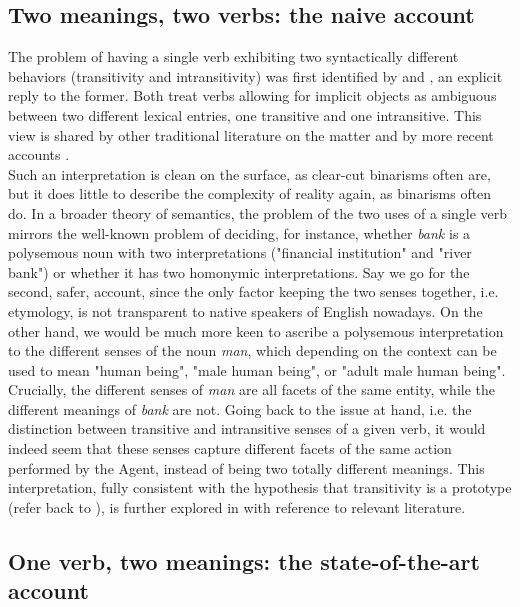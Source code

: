 \subsection{Two meanings, two verbs: the naive account} 

The problem of having a single verb exhibiting two syntactically different behaviors (transitivity and intransitivity) was first identified by \textcite{fodor1980functional} and \textcite{dowty1981quantification}, an explicit reply to the former. Both treat verbs allowing for implicit objects as ambiguous between two different lexical entries, one transitive and one intransitive. This view is shared by other traditional literature on the matter \parencite{Cote1996, Mittwoch1982, vanvalinlapolla1997syntax, brisson1994licensing, FellbaumKegl1989taxonomic} and by more recent accounts \parencite{PethoKardos2006, BourmayanRecanati2013}.\\
Such an interpretation is clean on the surface, as clear-cut binarisms often are, but it does little to describe the complexity of reality \textemdash again, as binarisms often do. In a broader theory of semantics, the problem of the two uses of a single verb mirrors the well-known problem of deciding, for instance, whether \textit{bank} is a polysemous noun with two interpretations ("financial institution" and "river bank") or whether it has two homonymic interpretations. Say we go for the second, safer, account, since the only factor keeping the two senses together, i.e. etymology, is not transparent to native speakers of English nowadays. On the other hand, we would be much more keen to ascribe a polysemous interpretation to the different senses of the noun \textit{man}, which depending on the context can be used to mean "human being", "male human being", or "adult male human being". Crucially, the different senses of \textit{man} are all facets of the same entity, while the different meanings of \textit{bank} are not. Going back to the issue at hand, i.e. the distinction between transitive and intransitive senses of a given verb, it would indeed seem that these senses capture different facets of the same action performed by the Agent, instead of being two totally different meanings. This interpretation, fully consistent with the hypothesis that transitivity is a prototype (refer back to ), is further explored in  with reference to relevant literature.


\subsection{One verb, two meanings: the state-of-the-art account} 

